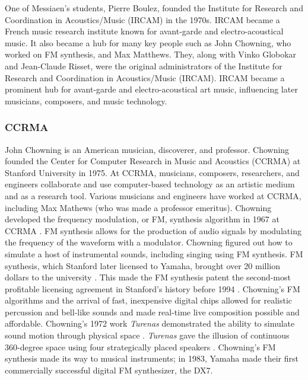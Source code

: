 \documentclass[letterpaper, 12pt]{article}
\begin{document}

%
One of Messiaen's students, Pierre Boulez, founded the Institute for Research and Coordination in Acoustics/Music (IRCAM) in the 1970s.
%
IRCAM became a French music research institute known for avant-garde and electro-acoustical music.
%
It also became a hub for many key people such as John Chowning, who worked on FM synthesis, and Max Matthews.
%
They, along with Vinko Globokar and Jean-Claude Risset, were the original administrators of the Institute for Research and Coordination in Acoustics/Music (IRCAM).
%
IRCAM became a prominent hub for avant-garde and electro-acoustical art music, influencing later musicians, composers, and music technology.

\subsubsection{CCRMA}


%
John Chowning is an American musician, discoverer, and professor.
%
Chowning founded the Center for Computer Research in Music and Acoustics (CCRMA) at Stanford University in 1975.
%
At CCRMA, musicians, composers, researchers, and engineers collaborate and use computer-based technology as an artistic medium and as a research tool.
%
Various musicians and engineers have worked at CCRMA, including Max Mathews (who was made a professor emeritus).
%
Chowning developed the frequency modulation, or FM, synthesis algorithm in 1967 at CCRMA \citep{chowning1973synthesis}.
%
FM synthesis allows for the production of audio signals by modulating the frequency of the waveform with a modulator.
%
Chowning figured out how to simulate a host of instrumental sounds, including singing using FM synthesis.
%
FM synthesis, which Stanford later licensed to Yamaha, brought over 20 million dollars to the university \citep{grove1980new}.
%
This made the FM synthesis patent the second-most profitable licensing agreement in Stanford's history before 1994 \citep{stanford2011music}.
%
Chowning's FM algorithms and the arrival of fast, inexpensive digital chips allowed for realistic percussion and bell-like sounds and made real-time live composition possible and affordable.
%
Chowning's 1972 work \textit{Turenas} demonstrated the ability to simulate sound motion through physical space \citep{chowning1972method}.
%
\textit{Turenas} gave the illusion of continuous 360-degree space using four strategically placed speakers \citep{grove1980new}.
%
Chowning's FM synthesis made its way to musical instruments; in 1983, Yamaha made their first commercially successful digital FM synthesizer, the DX7.
\end{document}
